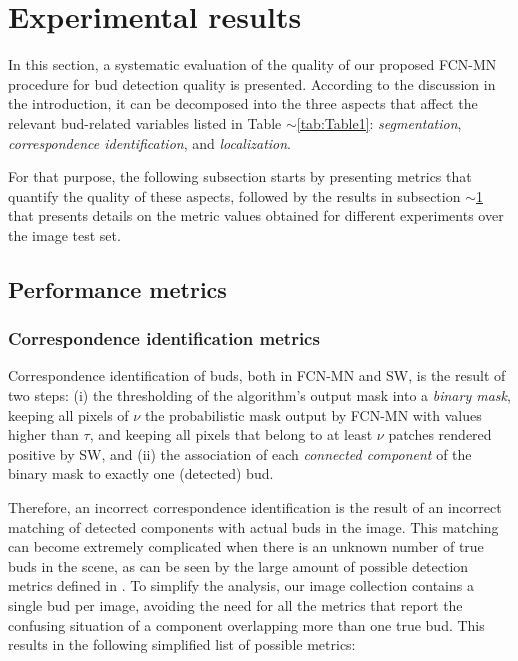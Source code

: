 \documentclass[a4paper,authoryear,review]{elsarticle}
\begin{document}
	\section{Experimental results} 
	\label{sec:results}
	
	In this section, a systematic evaluation of the quality of our proposed FCN-MN procedure for bud detection quality is presented. According to the discussion in the introduction, it can be decomposed into the three aspects that affect the relevant bud-related variables listed in Table $\sim$\ref{tab:Table1}: \emph{segmentation}, \emph{correspondence identification}, and \emph{localization}. 
	
	For that purpose, the following subsection starts by presenting metrics that quantify the quality of these aspects, followed by the results in subsection $\sim$\ref{sec:results} that presents details on the metric values obtained for different experiments over the image test set. 
	
	\subsection{Performance metrics}
	\label{sec:metrics}
	
	\subsubsection{Correspondence identification metrics}
	\label{subsec:detectmetrics}
	
	Correspondence identification of buds, both in  FCN-MN and SW, is the result of two steps: (i)  the thresholding of the algorithm’s output mask into a \emph{binary mask}, keeping all pixels of $\nu$ the probabilistic mask output by FCN-MN with values higher than $\tau$, and keeping all pixels that belong to at least $\nu$ patches rendered positive by SW, and (ii) the association of each \emph{connected component} of the binary mask to exactly one (detected) bud. 
	
	Therefore, an incorrect correspondence identification is the result of an incorrect matching of detected components with actual buds in the image. This matching can become extremely complicated when there is an unknown number of true buds in the scene, as can be seen by the large amount of possible detection metrics defined in \citet{oguz2017dice}. To simplify the analysis, our image collection contains a single bud per image, avoiding the need for all the metrics that report the confusing situation of a component overlapping more than one true bud. This results in the following simplified list of possible metrics:
	
\end{document}
